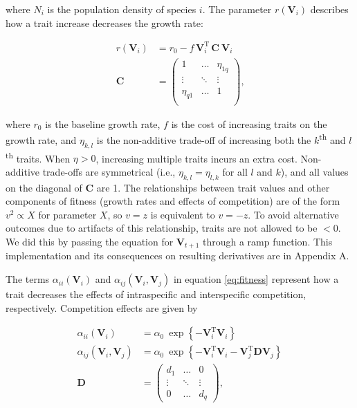 \noindent where $N_i$ is the population density of  species $i$.
The parameter $r(\mathbf{V}_i)$ describes how a trait increase
decreases the growth rate:

\begin{equation} \label{eq:growth-rate}
\begin{split}
    r(\mathbf{V}_i) &= r_0 - f \, \mathbf{V}_i^{\textrm{T}} \, \mathbf{C} ~ \mathbf{V}_{i} \\
    \mathbf{C} &= \begin{pmatrix}
        1         & \ldots & \eta_{1q} \\
        \vdots    & \ddots & \vdots \\
        \eta_{q1} & \ldots & 1      \\
        \end{pmatrix}
    \textrm{,}
\end{split}
\end{equation}

\noindent where $r_0$ is the baseline growth rate,
$f$ is the cost of increasing traits on the growth rate, and
$\eta_{k,l}$ is the non-additive trade-off of increasing both the
$k$\textsuperscript{th} and $l$\textsuperscript{th} traits.
When $\eta > 0$, increasing multiple traits incurs an extra cost.
Non-additive trade-offs are symmetrical (i.e., $\eta_{k,l} = \eta_{l,k}$ for all
$l$ and $k$), and all values on the diagonal of $\mathbf{C}$ are 1.
The relationships between trait values and other components of fitness
(growth rates and effects of competition) are of the form
$v^2 \propto X$ for parameter $X$, so $v = z$ is equivalent to $v = -z$.
To avoid alternative outcomes due to artifacts of this relationship,
traits are not allowed to be $< 0$.
We did this by passing the equation for $\mathbf{V}_{t+1}$ through a
ramp function.
This implementation and its consequences on resulting derivatives are in
Appendix A.


The terms $\alpha_{ii}(\mathbf{V}_i)$ and
$\alpha_{ij}(\mathbf{V}_i, \mathbf{V}_j)$
in equation \ref{eq:fitness} represent how a trait decreases the effects
of intraspecific and interspecific competition, respectively.
Competition effects are given by

\begin{equation} \label{eq:competition}
\begin{split}
    \alpha_{ii}(\mathbf{V}_i) &= \alpha_0 ~\exp \left\{
        - \mathbf{V}_i^{\textrm{T}}
        \mathbf{V}_i \right\} \\
    \alpha_{ij}(\mathbf{V}_i, \mathbf{V}_j) &= \alpha_0 ~\exp \left\{
        - \mathbf{V}_i^{\textrm{T}} \mathbf{V}_i -
        \mathbf{V}_j^{\textrm{T}} \mathbf{D} \mathbf{V}_j \right\} \\
    \mathbf{D} &= \begin{pmatrix}
        d_1     & \ldots    & 0 \\
        \vdots  & \ddots    & \vdots \\
        0       & \ldots    & d_q
        \end{pmatrix}
	\textrm{,}
\end{split}
\end{equation}

